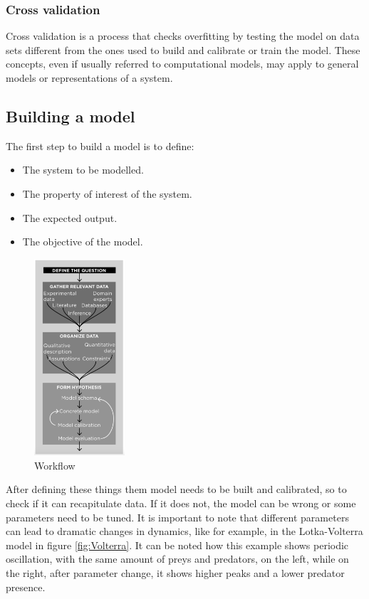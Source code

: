     \subsubsection{Cross validation}
    Cross validation is a process that checks overfitting by testing the model on data sets different from the ones used to build and calibrate or train the model.
  These concepts, even if usually referred to computational models, may apply to general models or representations of a system.

  \subsection{Building a model}
  The first step to build a model is to define:

  \begin{multicols}{2}
    \begin{itemize}
      \item The system to be modelled.
      \item The property of interest of the system.
      \item The expected output.
      \item The objective of the model.
    \end{itemize}
  \end{multicols}

  \begin{figure}[H]
    \centering
    \includegraphics[width=0.3\textwidth]{workflow.png}
    \caption{Workflow}
  \end{figure}

  After defining these things them model needs to be built and calibrated, so to check if it can recapitulate data.
  If it does not, the model can be wrong or some parameters need to be tuned.
  It is important to note that different parameters can lead to dramatic changes in dynamics, like for example, in the Lotka-Volterra model in figure \ref{fig:Volterra}.
  It can be noted how this example shows periodic oscillation, with the same amount of preys and predators, on the left, while on the right, after parameter change, it shows higher peaks and a lower predator presence.

